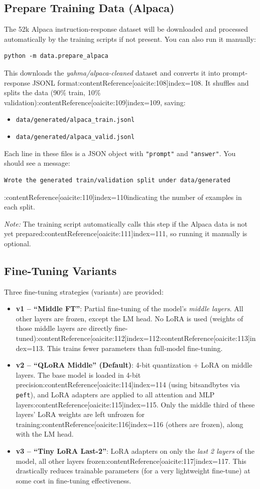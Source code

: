 \documentclass{article}
\begin{document}
\subsection{Prepare Training Data (Alpaca)}
The 52k Alpaca instruction-response dataset will be downloaded and processed automatically by the training scripts if not present. You can also run it manually:
\begin{verbatim}
python -m data.prepare_alpaca
\end{verbatim}
This downloads the \emph{yahma/alpaca-cleaned} dataset and converts it into prompt-response JSONL format:contentReference[oaicite:108]{index=108}. It shuffles and splits the data (90\% train, 10\% validation):contentReference[oaicite:109]{index=109}, saving:
\begin{itemize}
    \item \texttt{data/generated/alpaca\_train.jsonl}
    \item \texttt{data/generated/alpaca\_valid.jsonl}
\end{itemize}
Each line in these files is a JSON object with \texttt{"prompt"} and \texttt{"answer"}. You should see a message:
\begin{verbatim}
Wrote the generated train/validation split under data/generated
\end{verbatim}
:contentReference[oaicite:110]{index=110}indicating the number of examples in each split.

\emph{Note:} The training script automatically calls this step if the Alpaca data is not yet prepared:contentReference[oaicite:111]{index=111}, so running it manually is optional.

\subsection{Fine-Tuning Variants}
Three fine-tuning strategies (variants) are provided:
\begin{itemize}
    \item \textbf{v1 – “Middle FT”}: Partial fine-tuning of the model’s \emph{middle layers}. All other layers are frozen, except the LM head. No LoRA is used (weights of those middle layers are directly fine-tuned):contentReference[oaicite:112]{index=112}:contentReference[oaicite:113]{index=113}. This trains fewer parameters than full-model fine-tuning.
    \item \textbf{v2 – “QLoRA Middle” (Default)}: 4-bit quantization + LoRA on middle layers. The base model is loaded in 4-bit precision:contentReference[oaicite:114]{index=114} (using bitsandbytes via \texttt{peft}), and LoRA adapters are applied to all attention and MLP layers:contentReference[oaicite:115]{index=115}. Only the middle third of these layers’ LoRA weights are left unfrozen for training:contentReference[oaicite:116]{index=116} (others are frozen), along with the LM head.
    \item \textbf{v3 – “Tiny LoRA Last-2”}: LoRA adapters on only the \emph{last 2 layers} of the model, all other layers frozen:contentReference[oaicite:117]{index=117}. This drastically reduces trainable parameters (for a very lightweight fine-tune) at some cost in fine-tuning effectiveness.
\end{itemize}
\end{document}
